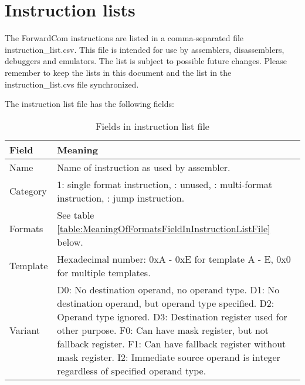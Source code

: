 \documentclass[forwardcom.tex]{subfiles}
\begin{document}
\RaggedRight

\chapter{Instruction lists}\label{chap:InstructionLists}
The ForwardCom instructions are listed in a comma-separated file instruction\_list.csv. This file is intended for use by assemblers, disassemblers, debuggers and emulators. The list is subject to possible future changes. Please remember to keep the lists in this document and the list in the instruction\_list.cvs file synchronized.
\vv

The instruction list file has the following fields:
\vv

\begin{longtable} {|p{18mm}|p{100mm}|}
\caption{Fields in instruction list file} 
\label{table:fieldsInInstructionListFile}
\\
\endfirsthead
\endhead
\hline
\bfseries Field & \bfseries Meaning  \\
\hline
Name & Name of instruction as used by assembler.  \\
\hline
Category & 1: single format instruction, \newline
           2: unused,  \newline
           3: multi-format instruction,  \newline
           4: jump instruction. \\
\hline
Formats & See table \ref{table:MeaningOfFormatsFieldInInstructionListFile} below.  \\
\hline
Template & Hexadecimal number:  \newline
           0xA - 0xE for template A - E,  \newline
           0x0 for multiple templates. \\
\hline
Variant & 
D0:  No destination operand, no operand type.\newline
D1:  No destination operand, but operand type specified.\newline
D2:  Operand type ignored.\newline
D3:  Destination register used for other purpose.\newline
F0:  Can have mask register, but not fallback register.\newline
F1:  Can have fallback register without mask register.\newline
I2:  Immediate source operand is integer regardless of specified operand type.\newline

\end{longtable}
\end{document}
